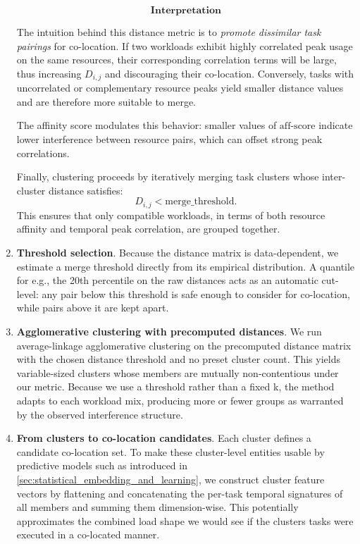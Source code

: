\begin{enumerate}
          \[
              \textbf{Interpretation}
          \]

          The intuition behind this distance metric is to
          \emph{promote dissimilar task pairings} for co-location.
          If two workloads exhibit highly correlated peak usage on the same resources,
          their corresponding correlation terms will be large,
          thus increasing \( D_{i,j} \) and discouraging their co-location.
          Conversely, tasks with uncorrelated or complementary resource peaks
          yield smaller distance values and are therefore more suitable to merge.

          The affinity score modulates this behavior:
          smaller values of \( \mathrm{aff\text{-}score} \)
          indicate lower interference between resource pairs,
          which can offset strong peak correlations.

          Finally, clustering proceeds by iteratively merging task clusters
          whose inter-cluster distance satisfies:
          \[
              D_{i,j} < \text{merge\_threshold}.
          \]
          This ensures that only compatible workloads, in terms of both
          resource affinity and temporal peak correlation, are grouped together.
    \item \textbf{Threshold selection}. Because the distance matrix is data-dependent, we estimate a merge threshold directly from its empirical distribution. A quantile for e.g., the 20th percentile on the raw distances acts as an automatic cut-level: any pair below this threshold is safe enough to consider for co-location, while pairs above it are kept apart.
    \item \textbf{Agglomerative clustering with precomputed distances}. We run average-linkage agglomerative clustering on the precomputed distance matrix with the chosen distance threshold and no preset cluster count. This yields variable-sized clusters whose members are mutually non-contentious under our metric. Because we use a threshold rather than a fixed k, the method adapts to each workload mix, producing more or fewer groups as warranted by the observed interference structure.
    \item\textbf{From clusters to co-location candidates}. Each cluster defines a candidate co-location set. To make these cluster-level entities usable by predictive models such as introduced in \ref{sec:statistical_embedding_and_learning}, we construct cluster feature vectors by flattening and concatenating the per-task temporal signatures of all members and summing them dimension-wise. This potentially approximates the combined load shape we would see if the clusters tasks were executed in a co-located manner.
\end{enumerate}

